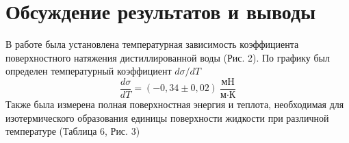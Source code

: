 \documentclass[a4paper,12pt]{article}
\theoremstyle{plain} %
\theoremstyle{definition} %
\theoremstyle{remark} %
\begin{document}
\section{Обсуждение результатов и выводы}
В работе была установлена температурная зависимость коэффициента поверхностного натяжения дистиллированной воды (Рис. 2). По графику был определен температурный коэффициент $d\sigma/dT$
\[\frac{d\sigma}{dT} = (-0,34\pm0,02) \ \frac{\text{мН}}{\text{м}\cdot \text{К}}\]
Также была измерена полная поверхностная энергия  и теплота, необходимая для изотермического образования единицы  поверхности жидкости  при различной температуре (Таблица 6, Рис. 3)
\end{document}
